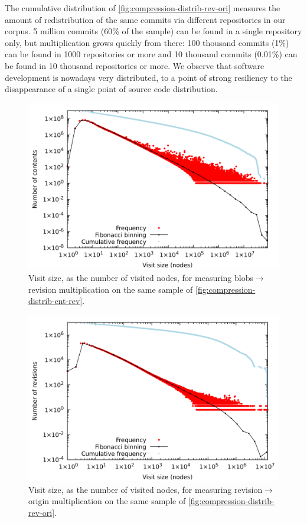 The cumulative distribution of \cref{fig:compression-distrib-rev-ori} measures
the amount of redistribution of the same commits via different repositories in
our corpus. 5 million commits (60\% of the sample) can be found in a single
repository only, but multiplication grows quickly from there: 100 thousand
commits (1\%) can be found in 1000 repositories or more and 10 thousand commits
(0.01\%) can be found in 10 thousand repositories or more. We observe that
software development is nowadays very distributed, to a point of strong
resiliency to the disappearance of a single point of source code distribution.

\begin{figure}
  \centering
  \includegraphics[width=0.7\linewidth]{img/compression/distributions/contents_node_size.png}
  \caption{Visit size, as the number of visited nodes, for measuring
    blobs$\to$revision multiplication on the same sample of
    \cref{fig:compression-distrib-cnt-rev}.}%
  \label{fig:compression-size-cnt-rev}
\end{figure}

\begin{figure}
  \centering
  \includegraphics[width=0.7\linewidth]{img/compression/distributions/revisions_node_size.png}
  \caption{Visit size, as the number of visited nodes, for measuring
    revision$\to$origin multiplication on the same sample of
    \cref{fig:compression-distrib-rev-ori}.}%
  \label{fig:compression-size-rev-ori}
\end{figure}

